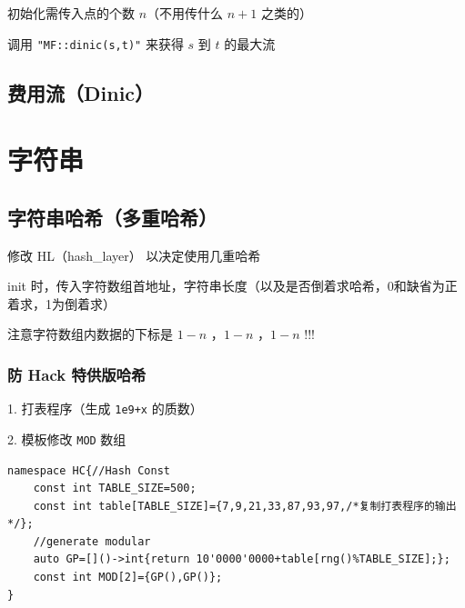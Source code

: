 \documentclass[12pt]{article}
\begin{document}
初始化需传入点的个数 $n$（不用传什么 $n+1$ 之类的）

调用 \texttt{"MF::dinic(s,t)"} 来获得 $s$ 到 $t$ 的最大流



\newpage

\subsection{费用流（Dinic）}



\newpage

{\centering\section{字符串}}

\subsection{字符串哈希（多重哈希）}

修改 HL（hash\_{}layer） 以决定使用几重哈希

init 时，传入字符数组首地址，字符串长度（以及是否倒着求哈希，0和缺省为正着求，1为倒着求）

注意字符数组内数据的下标是 $1-n$ ，$1-n$ ，$1-n$ !!!



\newpage

\subsubsection{防 Hack 特供版哈希}

1. 打表程序（生成 \texttt{1e9+x} 的质数）



2. 模板修改 \texttt{MOD} 数组

\begin{lstlisting}[style=C++]
namespace HC{//Hash Const
	const int TABLE_SIZE=500;
	const int table[TABLE_SIZE]={7,9,21,33,87,93,97,/*复制打表程序的输出*/};
	//generate modular
	auto GP=[]()->int{return 10'0000'0000+table[rng()%TABLE_SIZE];};
	const int MOD[2]={GP(),GP()};
}
\end{lstlisting}

\newpage
\end{document}
